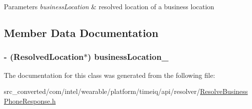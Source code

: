 \begin{DoxyParams}{Parameters}
{\em business\+Location} & resolved location of a business location \\
\hline
\end{DoxyParams}


\subsection{Member Data Documentation}
\hypertarget{interface_resolve_business_phone_response_afe08a449f7de96fb26b834fced2e4114}{}
\subsubsection[{business\+Location\+\_\+}]{\setlength{\rightskip}{0pt plus 5cm}-\/ ({\bf Resolved\+Location}$\ast$) business\+Location\+\_\+}\label{interface_resolve_business_phone_response_afe08a449f7de96fb26b834fced2e4114}


The documentation for this class was generated from the following file\+:\begin{DoxyCompactItemize}
\item 
src\+\_\+converted/com/intel/wearable/platform/timeiq/api/resolver/\hyperlink{_resolve_business_phone_response_8h}{Resolve\+Business\+Phone\+Response.\+h}\end{DoxyCompactItemize}
